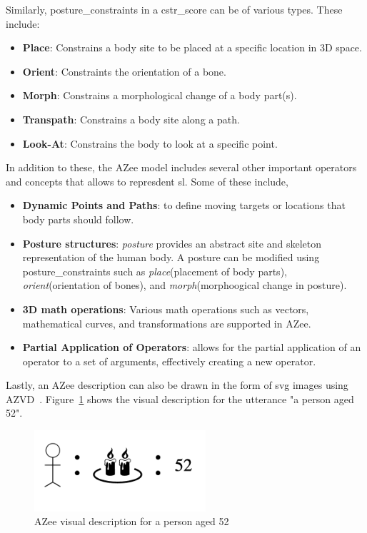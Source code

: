 \documentclass[../../main.tex]{subfiles}
\begin{document}
Similarly, \gls{posture_constraint}s in a \gls{cstr_score} can be of various types. These include:

\begin{itemize}
  \item \textbf{Place}: Constrains a body \gls{site} to be placed at a specific location in 3D space.
  \item \textbf{Orient}: Constraints the orientation of a bone.
  \item \textbf{Morph}: Constrains a morphological change of a body part(s).
  \item \textbf{Transpath}: Constrains a body \gls{site} along a path.
  \item \textbf{Look-At}: Constrains the body to look at a specific point.
\end{itemize}

In addition to these, the AZee model includes several other important operators and concepts that allows to represdent \gls{sl}. Some of these include,

\begin{itemize}
  \item \textbf{Dynamic Points and Paths}: to define moving targets or locations that body parts should follow.
  \item \textbf{Posture structures}: \emph{posture} provides an abstract site and skeleton representation of the human body. A posture can be modified using \gls{posture_constraint}s such as \emph{place}(placement of body parts), \emph{orient}(orientation of bones), and \emph{morph}(morphoogical change in posture).
  \item \textbf{3D math operations}: Various math operations such as vectors, mathematical curves, and transformations are supported in AZee.
  \item \textbf{Partial Application of Operators}: allows for the partial application of an operator to a set of arguments, effectively creating a new operator.
\end{itemize}

Lastly, an AZee description can also be drawn in the form of svg images using AZVD~\cite{filhol2024software}. Figure~\ref{fig:azvd} shows the visual description for the \gls{utterance} "a person aged 52".

\begin{figure}
  \centering \includegraphics[width = 2.5in]{chapters/background_work/images/azvd.png}
  \caption{AZee visual description for a person aged 52}
  \label{fig:azvd}
\end{figure}
\end{document}
